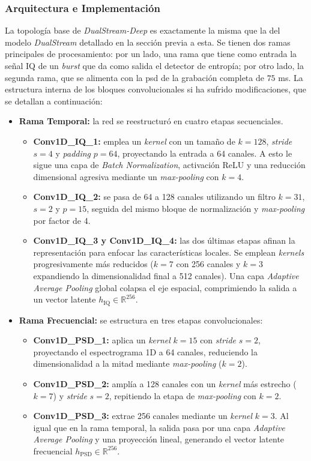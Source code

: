 \subsubsection{Arquitectura e Implementación}
La topología base de \textit{DualStream-Deep} es exactamente la misma que la del modelo \textit{DualStream} detallado en la sección previa a esta. Se tienen dos ramas principales de procesamiento: por un lado, una rama que tiene como entrada la señal IQ de un \textit{burst} que da como salida el detector de entropía; por otro lado, la segunda rama, que se alimenta con la \gls{psd} de la grabación completa de $75$ ms. La estructura interna de los bloques convolucionales si ha sufrido modificaciones, que se detallan a continuación:

\begin{itemize}
    \item \textbf{Rama Temporal:} la red se reestructuró en cuatro etapas secuenciales. 
    \begin{itemize}
        \item \textbf{Conv1D\_IQ\_1:} emplea un \textit{kernel} con un tamaño de $k=128$, \textit{stride} $s=4$ y \textit{padding} $p=64$, proyectando la entrada a 64 canales. A esto le sigue una capa de \textit{Batch Normalization}, activación ReLU y una reducción dimensional agresiva mediante un \textit{max-pooling} con $k=4$.
        \item \textbf{Conv1D\_IQ\_2:} se pasa de 64 a 128 canales utilizando un filtro $k=31$, $s=2$ y $p=15$, seguida del mismo bloque de normalización y \textit{max-pooling} por factor de 4.
        \item \textbf{Conv1D\_IQ\_3 y Conv1D\_IQ\_4:} las dos últimas etapas afinan la representación para enfocar las características locales. Se emplean \textit{kernels} progresivamente más reducidos ($k=7$ con 256 canales y $k=3$ expandiendo la dimensionalidad final a 512 canales). Una capa \textit{Adaptive Average Pooling} global colapsa el eje espacial, comprimiendo la salida a un vector latente $h_{\text{IQ}} \in \mathbb{R}^{256}$.
    \end{itemize}

    \item \textbf{Rama Frecuencial:} se estructura en tres etapas convolucionales:
    \begin{itemize}
        \item \textbf{Conv1D\_PSD\_1:} aplica un \textit{kernel} $k=15$ con \textit{stride} $s=2$, proyectando el espectrograma 1D a 64 canales, reduciendo la dimensionalidad a la mitad mediante \textit{max-pooling} ($k=2$).
        \item \textbf{Conv1D\_PSD\_2:} amplía a 128 canales con un \textit{kernel} más estrecho ($k=7$) y \textit{stride} $s=2$, repitiendo la etapa de \textit{max-pooling} con $k=2$.
        \item \textbf{Conv1D\_PSD\_3:} extrae 256 canales mediante un \textit{kernel} $k=3$. Al igual que en la rama temporal, la salida pasa por una capa \textit{Adaptive Average Pooling} y una proyección lineal, generando el vector latente frecuencial $h_{\text{PSD}} \in \mathbb{R}^{256}$.
    \end{itemize}
\end{itemize}

